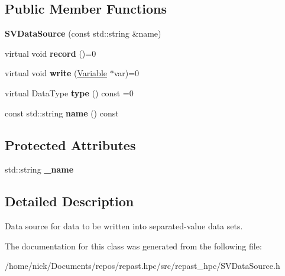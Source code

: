 \subsection*{Public Member Functions}
\begin{DoxyCompactItemize}
\item 
\hypertarget{classrepast_1_1_s_v_data_source_a5a49ad1041252dab39f3060ae87ce58e}{{\bfseries S\-V\-Data\-Source} (const std\-::string \&name)}\label{classrepast_1_1_s_v_data_source_a5a49ad1041252dab39f3060ae87ce58e}

\item 
\hypertarget{classrepast_1_1_s_v_data_source_a2248758957add75f32afae0b2b4f0a38}{virtual void {\bfseries record} ()=0}\label{classrepast_1_1_s_v_data_source_a2248758957add75f32afae0b2b4f0a38}

\item 
\hypertarget{classrepast_1_1_s_v_data_source_aef81c7038475612e7269c7c0c915f5f2}{virtual void {\bfseries write} (\hyperlink{classrepast_1_1_variable}{Variable} $\ast$var)=0}\label{classrepast_1_1_s_v_data_source_aef81c7038475612e7269c7c0c915f5f2}

\item 
\hypertarget{classrepast_1_1_s_v_data_source_a76ecff693c73b2468f7bc2513265d3ed}{virtual Data\-Type {\bfseries type} () const =0}\label{classrepast_1_1_s_v_data_source_a76ecff693c73b2468f7bc2513265d3ed}

\item 
\hypertarget{classrepast_1_1_s_v_data_source_af187b215688f83eba4feb8dbd1c96132}{const std\-::string {\bfseries name} () const }\label{classrepast_1_1_s_v_data_source_af187b215688f83eba4feb8dbd1c96132}

\end{DoxyCompactItemize}
\subsection*{Protected Attributes}
\begin{DoxyCompactItemize}
\item 
\hypertarget{classrepast_1_1_s_v_data_source_acd400ad4c434f837dc41f4aecb5499f2}{std\-::string {\bfseries \-\_\-name}}\label{classrepast_1_1_s_v_data_source_acd400ad4c434f837dc41f4aecb5499f2}

\end{DoxyCompactItemize}


\subsection{Detailed Description}
Data source for data to be written into separated-\/value data sets. 

The documentation for this class was generated from the following file\-:\begin{DoxyCompactItemize}
\item 
/home/nick/\-Documents/repos/repast.\-hpc/src/repast\-\_\-hpc/S\-V\-Data\-Source.\-h\end{DoxyCompactItemize}
